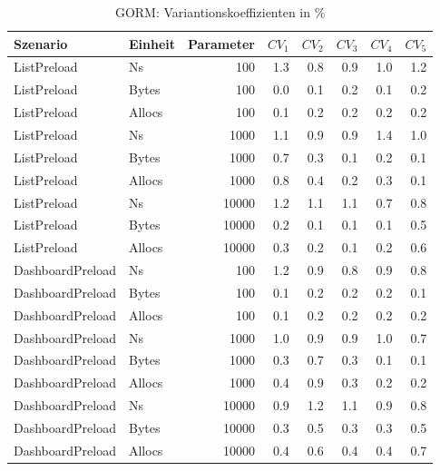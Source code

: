 
\begin{table}[ht]
\setlength{\extrarowheight}{-1pt}
\centering
\caption{GORM: Variantionskoeffizienten in \%}
\begin{tabular}{llrrrrrr}
\toprule
Szenario & Einheit & Parameter & ${CV_1}$ & ${CV_2}$ & ${CV_3}$& ${CV_4}$ & ${CV_5}$ \\
\midrule
	ListPreload & Ns & 100 &  1.3 &  0.8 &  0.9 &  1.0 &  1.2 \\
	ListPreload & Bytes & 100 &  0.0 &  0.1 &  0.2 &  0.1 &  0.2 \\
	ListPreload & Allocs & 100 &  0.1 &  0.2 &  0.2 &  0.2 &  0.2 \\
	ListPreload & Ns & 1000 &  1.1 &  0.9 &  0.9 &  1.4 &  1.0 \\
	ListPreload & Bytes & 1000 &  0.7 &  0.3 &  0.1 &  0.2 &  0.1 \\
	ListPreload & Allocs & 1000 &  0.8 &  0.4 &  0.2 &  0.3 &  0.1 \\
	ListPreload & Ns & 10000 &  1.2 &  1.1 &  1.1 &  0.7 &  0.8 \\
	ListPreload & Bytes & 10000 &  0.2 &  0.1 &  0.1 &  0.1 &  0.5 \\
	ListPreload & Allocs & 10000 &  0.3 &  0.2 &  0.1 &  0.2 &  0.6 \\
	DashboardPreload & Ns & 100 &  1.2 &  0.9 &  0.8 &  0.9 &  0.8 \\
	DashboardPreload & Bytes & 100 &  0.1 &  0.2 &  0.2 &  0.2 &  0.1 \\
	DashboardPreload & Allocs & 100 &  0.1 &  0.2 &  0.2 &  0.2 &  0.2 \\
	DashboardPreload & Ns & 1000 &  1.0 &  0.9 &  0.9 &  1.0 &  0.7 \\
	DashboardPreload & Bytes & 1000 &  0.3 &  0.7 &  0.3 &  0.1 &  0.1 \\
	DashboardPreload & Allocs & 1000 &  0.4 &  0.9 &  0.3 &  0.2 &  0.2 \\
	DashboardPreload & Ns & 10000 &  0.9 &  1.2 &  1.1 &  0.9 &  0.8 \\
	DashboardPreload & Bytes & 10000 &  0.3 &  0.5 &  0.3 &  0.3 &  0.5 \\
	DashboardPreload & Allocs & 10000 &  0.4 &  0.6 &  0.4 &  0.4 &  0.7 \\
\bottomrule
\end{tabular}
\label{tab:variationskoeffizienten_gorm}
\end{table}
	